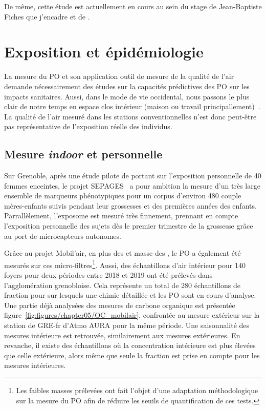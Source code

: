 De même, cette étude est actuellement en cours au sein du stage de Jean-Baptiste Fiches
que j'encadre et de \cite{borlazaUrbaninprep.}.

\section{Exposition et épidémiologie}

La mesure du PO et son application outil de mesure de la qualité de l'air demande
nécessairement des études sur la capacités prédictives des PO sur les impacts sanitaires.
Aussi, dans le mode de vie occidental, nous passons le plus clair de notre temps en espace
clos intérieur (maison ou travail
principallement)~\autocite{netheryTime2009,ouidirEstimation2015}. La qualité de l'air
mesuré dans les stations conventionnelles n'est donc peut-être pas représentative de
l'exposition réelle des individus.

\subsection{Mesure \textit{indoor} et personnelle}

Sur Grenoble, après une étude pilote de \cite{ouidirEstimation2015} portant sur
l'exposition personnelle de 40 femmes enceintes, le projet
SEPAGES~\autocite{lyon-caenDeciphering2019} a pour ambition la mesure d'un très large
ensemble de marqueurs phénotypiques pour un corpus d'environ 480 couple mères-enfants
suivis pendant leur grossesses et des premières années des enfants. Parrallèlement,
l'exposome est mesuré très finnement, prennant en compte l'exposition personnelle des
sujets dès le premier trimestre de la grossesse grâce au port de microcapteurs autonomes.

Grâce au projet Mobil'air, en plus des  et masse des \PMdc, le PO a également été
mesurés sur ces micro-filtres\footnote{Les faibles masses prélevées ont fait l'objet
    d'une adaptation méthodologique sur la mesure du PO afin de réduire les seuils de
quantification de ces tests.}.
Aussi, des échantillons d'air intérieur pour 140 foyers pour deux périodes entre 2018 et
2019 ont été prélevés dans l'agglomération grenobloise. Cela représente un total de 280
échantillons de fraction \PMdc{} pour sur lesquels une chimie détaillée et les PO sont en
cours d'analyse. Une partie déjà analysées des mesures de carbone organique est présentée
figure~\ref{fig:figures/chapter05/OC_mobilair}, confrontée au mesure extérieur sur la
station de GRE-fr d'Atmo AURA pour la même période. Une saisonnalité des mesures
intérieure est retrouvée, similairement aux mesures extérieures. En revanche, il existe
des échantillons où la concentration intérieure est plus élevées que celle extérieure,
alors même que seule la fraction \PMdc{} est prise en compte pour les mesures intérieures.

